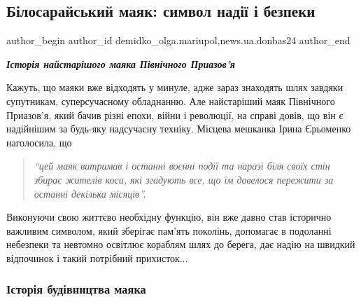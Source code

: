  
 
 
 
 
 
\subsection{Білосарайський маяк: символ надії і безпеки}
\label{sec:27_06_2022.stz.news.ua.donbas24.1.bilosarajskij_majak_symvol_nadii_bezpeky}
 
\ifcmt
 author_begin
   author_id demidko_olga.mariupol,news.ua.donbas24
 author_end
\fi

\begin{center}
  \em\color{blue}\bfseries\Large
Історія найстарішого маяка Північного Приазов'я
\end{center}

Кажуть, що маяки вже відходять у минуле, адже зараз знаходять шлях завдяки
супутникам, суперсучасному обладнанню. Але найстаріший маяк Північного
Приазов'я, який бачив різні епохи, війни і революції, на справі довів, що він є
надійнішим за будь-яку надсучасну техніку. Місцева мешканка Ірина Єрьоменко
наголосила, що 
\begin{quote}
\em\enquote{цей маяк витримав і останні воєнні події та наразі біля своїх
стін збирає жителів коси, які згадують все, що їм довелося пережити за останні
декілька місяців}. 
\end{quote}
Виконуючи свою життєво необхідну функцію, він вже давно став
історично важливим символом, який зберігає пам'ять поколінь, допомагає в
подоланні небезпеки та невтомно освітлює кораблям шлях до берега, дає надію на
швидкий відпочинок і такий потрібний прихисток... 

\subsubsection{Історія будівництва маяка}

